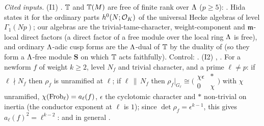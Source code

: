 \noindent\emph{Cited inputs.}
(I1) \cite[Thm~3.1, Cor.~3.2]{Hi86b}. $\mathbb{T}$ and $\mathbb{T}(M)$ are free of finite rank over $\Lambda$ ($p\ge5$): \cite[Thm~3.1, p.~250]{Hi86b}
 \stcited. Hida states it for the
ordinary parts $h^0(N;\mathcal{O}_K)$ of the universal Hecke algebras of level $\Gamma_1(Np)$; our algebras are the trivial-tame-character,
weight-component and $\mathfrak{m}$-local direct factors (a direct factor of a free module over the local ring $\Lambda$ is free), and ordinary
$\Lambda$-adic cusp forms are the $\Lambda$-dual of $\mathbb{T}$ by the duality of \cite[\S2]{Hi86b} (so they form a $\Lambda$-free module $\mathbf S$ on
which $\mathbb{T}$ acts faithfully). Control: \cite[Cor.~3.2, (3.3b), p.~250]{Hi86b} \stcited.
(I2) \cite[Thm~3.1]{DDT97}, \cite[Th.~(A)]{Car86}. For a newform $f$ of weight $k\ge2$, level $N_f$ and trivial character, and a prime $\ell\ne p$: if $\ell\nmid N_f$ then $\rho_f$
is unramified at $\ell$; if $\ell\,\|\,N_f$ then $\rho_f|_{G_\ell}\cong\big(\begin{smallmatrix}\chi\epsilon&*\\0&\chi\end{smallmatrix}\big)$ with
$\chi$ unramified, $\chi(\mathrm{Frob}_\ell)=a_\ell(f)$, $\epsilon$ the cyclotomic character and $*$ non-trivial on inertia (the conductor
exponent at $\ell$ is $1$); since $\det\rho_f=\epsilon^{k-1}$, this gives $a_\ell(f)^2=\ell^{k-2}$:
 and in general
 \stcited.

